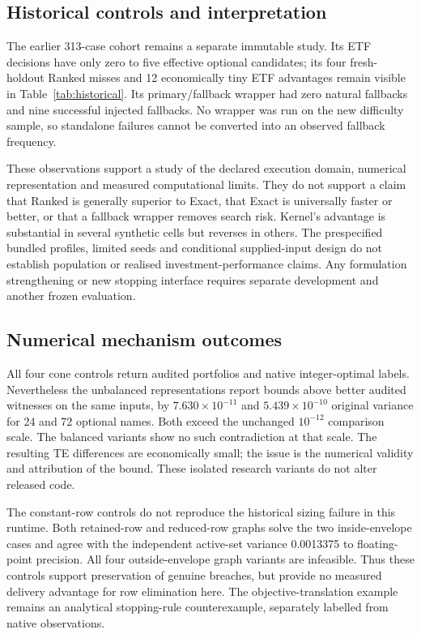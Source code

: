 \documentclass[11pt]{article}
\begin{document}
\subsection{Historical controls and interpretation}
The earlier 313-case cohort remains a separate immutable study. Its ETF
decisions have only zero to five effective optional candidates; its four
fresh-holdout Ranked misses and 12 economically tiny ETF advantages remain
visible in Table~\ref{tab:historical}. Its primary/fallback wrapper had zero
natural fallbacks and nine successful injected fallbacks. No wrapper was
run on the new difficulty sample, so standalone failures cannot be converted
into an observed fallback frequency.



These observations support a study of the declared execution domain, numerical
representation and measured computational limits. They do not support a claim
that Ranked is generally superior to Exact, that Exact is universally faster
or better, or that a fallback wrapper removes search risk. Kernel's advantage
is substantial in several synthetic cells but reverses in others. The
prespecified bundled profiles, limited seeds and conditional supplied-input
design do not establish population or realised investment-performance claims.
Any formulation strengthening or new stopping interface requires separate
development and another frozen evaluation.

\subsection{Numerical mechanism outcomes}
All four cone controls return audited portfolios and native integer-optimal
labels. Nevertheless the unbalanced representations report bounds above
better audited witnesses on the same inputs, by $7.630\times10^{-11}$ and
$5.439\times10^{-10}$ original variance for 24 and 72 optional names.
Both exceed the unchanged $10^{-12}$ comparison scale. The balanced variants
show no such contradiction at that scale. The resulting TE differences are
economically small; the issue is the numerical validity and attribution of
the bound. These isolated research variants do not alter released code.



The constant-row controls do not reproduce the historical sizing failure in
this runtime. Both retained-row and reduced-row graphs solve the two
inside-envelope cases and agree with the independent active-set variance
0.0013375 to floating-point precision. All four outside-envelope graph
variants are infeasible. Thus these controls support preservation of genuine
breaches, but provide no measured delivery advantage for row elimination here.
The objective-translation example remains an analytical stopping-rule
counterexample, separately labelled from native observations.
\end{document}
